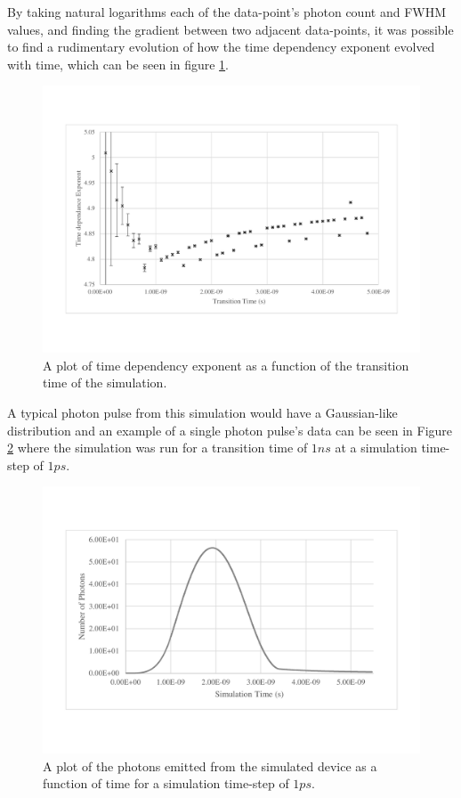 \documentclass[titlepage]{article}
\begin{document}
By taking natural logarithms each of the data-point's photon count and FWHM values, and finding the gradient between two adjacent data-points, it was possible to find a rudimentary evolution of how the time dependency exponent evolved with time, which can be seen in figure \ref{res:Mic:G5}.
\begin{figure}[H]
	\centering
	\includegraphics[scale=0.4]{Figures/Micro_TimeDepExponent}
	\caption{A plot of time dependency exponent as a function of the transition time of the simulation.\label{res:Mic:G5}}
\end{figure}

A typical photon pulse from this simulation would have a Gaussian-like distribution and an example of a single photon pulse's data can be seen in Figure \ref{res:Mic:G6} where the simulation was run for a transition time of $1 ns$ at a simulation time-step of $1ps$.
\begin{figure}[H]
	\centering
	\includegraphics[scale=0.4]{Figures/Micro_PhotonPulse}
	\caption{A plot of the photons emitted from the simulated device as a function of time for a simulation time-step of $1ps$.\label{res:Mic:G6}}
\end{figure}
\end{document}
